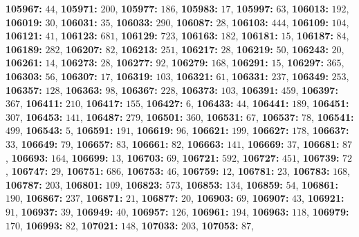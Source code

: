 \textsf{\bfseries 105967:} $44$, \textsf{\bfseries 105971:} $200$, \textsf{\bfseries 105977:} $186$, \textsf{\bfseries 105983:} $17$, \textsf{\bfseries 105997:} $63$, \textsf{\bfseries 106013:} $192$, \textsf{\bfseries 106019:} $30$, \textsf{\bfseries 106031:} $35$, \textsf{\bfseries 106033:} $290$, \textsf{\bfseries 106087:} $28$, \textsf{\bfseries 106103:} $444$, \textsf{\bfseries 106109:} $104$, \textsf{\bfseries 106121:} $41$, \textsf{\bfseries 106123:} $681$, \textsf{\bfseries 106129:} $723$, \textsf{\bfseries 106163:} $182$, \textsf{\bfseries 106181:} $15$, \textsf{\bfseries 106187:} $84$, \textsf{\bfseries 106189:} $282$, \textsf{\bfseries 106207:} $82$, \textsf{\bfseries 106213:} $251$, \textsf{\bfseries 106217:} $28$, \textsf{\bfseries 106219:} $50$, \textsf{\bfseries 106243:} $20$, \textsf{\bfseries 106261:} $14$, \textsf{\bfseries 106273:} $28$, \textsf{\bfseries 106277:} $92$, \textsf{\bfseries 106279:} $168$, \textsf{\bfseries 106291:} $15$, \textsf{\bfseries 106297:} $365$, \textsf{\bfseries 106303:} $56$, \textsf{\bfseries 106307:} $17$, \textsf{\bfseries 106319:} $103$, \textsf{\bfseries 106321:} $61$, \textsf{\bfseries 106331:} $237$, \textsf{\bfseries 106349:} $253$, \textsf{\bfseries 106357:} $128$, \textsf{\bfseries 106363:} $98$, \textsf{\bfseries 106367:} $228$, \textsf{\bfseries 106373:} $103$, \textsf{\bfseries 106391:} $459$, \textsf{\bfseries 106397:} $367$, \textsf{\bfseries 106411:} $210$, \textsf{\bfseries 106417:} $155$, \textsf{\bfseries 106427:} $6$, \textsf{\bfseries 106433:} $44$, \textsf{\bfseries 106441:} $189$, \textsf{\bfseries 106451:} $307$, \textsf{\bfseries 106453:} $141$, \textsf{\bfseries 106487:} $279$, \textsf{\bfseries 106501:} $360$, \textsf{\bfseries 106531:} $67$, \textsf{\bfseries 106537:} $78$, \textsf{\bfseries 106541:} $499$, \textsf{\bfseries 106543:} $5$, \textsf{\bfseries 106591:} $191$, \textsf{\bfseries 106619:} $96$, \textsf{\bfseries 106621:} $199$, \textsf{\bfseries 106627:} $178$, \textsf{\bfseries 106637:} $33$, \textsf{\bfseries 106649:} $79$, \textsf{\bfseries 106657:} $83$, \textsf{\bfseries 106661:} $82$, \textsf{\bfseries 106663:} $141$, \textsf{\bfseries 106669:} $37$, \textsf{\bfseries 106681:} $87$, \textsf{\bfseries 106693:} $164$, \textsf{\bfseries 106699:} $13$, \textsf{\bfseries 106703:} $69$, \textsf{\bfseries 106721:} $592$, \textsf{\bfseries 106727:} $451$, \textsf{\bfseries 106739:} $72$, \textsf{\bfseries 106747:} $29$, \textsf{\bfseries 106751:} $686$, \textsf{\bfseries 106753:} $46$, \textsf{\bfseries 106759:} $12$, \textsf{\bfseries 106781:} $23$, \textsf{\bfseries 106783:} $168$, \textsf{\bfseries 106787:} $203$, \textsf{\bfseries 106801:} $109$, \textsf{\bfseries 106823:} $573$, \textsf{\bfseries 106853:} $134$, \textsf{\bfseries 106859:} $54$, \textsf{\bfseries 106861:} $190$, \textsf{\bfseries 106867:} $237$, \textsf{\bfseries 106871:} $21$, \textsf{\bfseries 106877:} $20$, \textsf{\bfseries 106903:} $69$, \textsf{\bfseries 106907:} $43$, \textsf{\bfseries 106921:} $91$, \textsf{\bfseries 106937:} $39$, \textsf{\bfseries 106949:} $40$, \textsf{\bfseries 106957:} $126$, \textsf{\bfseries 106961:} $194$, \textsf{\bfseries 106963:} $118$, \textsf{\bfseries 106979:} $170$, \textsf{\bfseries 106993:} $82$, \textsf{\bfseries 107021:} $148$, \textsf{\bfseries 107033:} $203$, \textsf{\bfseries 107053:} $87$, 
